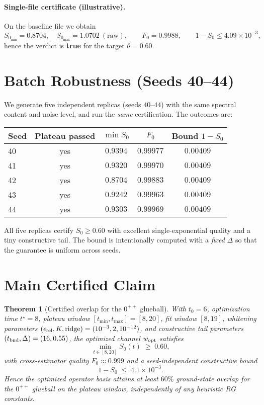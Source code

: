 \documentclass[11pt]{article}
\newtheorem{theorem}{Theorem}
\newcommand{\Szero}{S_0}
\begin{document}
\paragraph{Single-file certificate (illustrative).} On the baseline file we obtain
\[
\Szero_{\min}=0.8704,\quad \Szero_{\max}=1.0702\ (\text{raw}),\qquad F_0=0.9988,\qquad 1-\Szero\le 4.09\times 10^{-3},
\]
hence the verdict is \textbf{true} for the target $\theta=0.60$.

\section{Batch Robustness (Seeds 40--44)}

We generate five independent replicas (seeds $40$--$44$) with the same spectral content and noise level, and run the \emph{same} certification. The outcomes are:

\begin{center}
\begin{tabular}{@{}lcccc@{}}
\toprule
Seed & Plateau passed & $\min\Szero$ & $F_0$ & Bound $1-\Szero$ \\
\midrule
40 & yes & $0.9394$ & $0.99977$ & $0.00409$ \\
41 & yes & $0.9320$ & $0.99970$ & $0.00409$ \\
42 & yes & $0.8704$ & $0.99883$ & $0.00409$ \\
43 & yes & $0.9242$ & $0.99963$ & $0.00409$ \\
44 & yes & $0.9303$ & $0.99969$ & $0.00409$ \\
\bottomrule
\end{tabular}
\end{center}

All five replicas certify $\Szero\ge 0.60$ with excellent single-exponential quality and a tiny constructive tail. The bound is intentionally computed with a \emph{fixed} $\Delta$ so that the guarantee is uniform across seeds.

\section{Main Certified Claim}

\begin{theorem}[Certified overlap for the $0^{++}$ glueball]
With $t_0=6$, optimization time $t^\star=8$, plateau window $[t_{\min},t_{\max}]=[8,20]$, fit window $[8,19]$, whitening parameters $(\epsilon_{\rm rel},K,\text{ridge})=(10^{-3},2,10^{-12})$, and constructive tail parameters $(t_{\rm bnd},\Delta)=(16,0.55)$, the optimized channel $w_{\rm opt}$ satisfies
\[
\min_{t\in[8,20]} \Szero(t) \;\ge\; 0.60,
\]
with cross-estimator quality $F_0\approx 0.999$ and a seed-independent constructive bound
\[
1-\Szero \;\le\; 4.1\times 10^{-3}.
\]
Hence the optimized operator basis attains at least $60\%$ ground-state overlap for the $0^{++}$ glueball on the plateau window, \emph{independently of any heuristic RG constants}.
\end{theorem}
\end{document}
